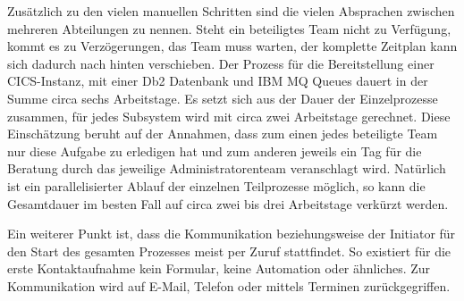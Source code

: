 Zusätzlich zu den vielen manuellen Schritten sind die vielen Absprachen zwischen mehreren Abteilungen zu nennen.
Steht ein beteiligtes Team nicht zu Verfügung, kommt es zu Verzögerungen, das Team muss warten, der komplette Zeitplan kann sich dadurch nach hinten verschieben.
Der Prozess für die Bereitstellung einer CICS-Instanz, mit einer Db2 Datenbank und IBM MQ Queues dauert in der Summe circa sechs Arbeitstage.
Es setzt sich aus der Dauer der Einzelprozesse zusammen, für jedes Subsystem wird mit circa zwei Arbeitstage gerechnet.
Diese Einschätzung beruht auf der Annahmen, dass zum einen jedes beteiligte Team nur diese Aufgabe zu erledigen hat und zum anderen jeweils ein Tag für die Beratung durch das jeweilige Administratorenteam veranschlagt wird.
Natürlich ist ein parallelisierter Ablauf der einzelnen Teilprozesse möglich, so kann die Gesamtdauer im besten Fall auf circa zwei bis drei Arbeitstage verkürzt werden.

Ein weiterer Punkt ist, dass die Kommunikation beziehungsweise der Initiator für den Start des gesamten Prozesses meist per Zuruf stattfindet.
So existiert für die erste Kontaktaufnahme kein Formular, keine Automation oder ähnliches.
Zur Kommunikation wird auf E-Mail, Telefon oder mittels Terminen zurückgegriffen.


 
